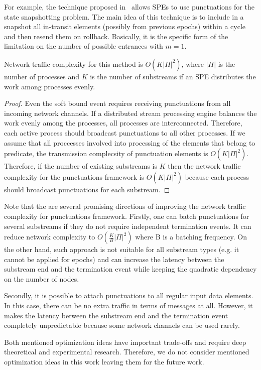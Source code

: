 For example, the technique proposed in~\cite{Carbone:2017:SMA:3137765.3137777} allows SPEs to use punctuations for the state snapshotting problem. The main idea of this technique is to include in a snapshot all in-transit elements (possibly from previous epochs) within a cycle and then resend them on rollback. Basically, it is the specific form of the limitation on the number of possible entrances with $m=1$.

\begin{lemma}
Network traffic complexity for this method is $O(K|\Pi|^2)$, where $|\Pi|$ is the number of processes and $K$ is the number of substreams if an SPE distributes the work among processes evenly.
\end{lemma}
\begin{proof}

Even the soft bound event requires receiving punctuations from all incoming network channels. If a distributed stream processing engine balances the work evenly among the processes, all processes are interconnected. Therefore, each active process should broadcast punctuations to all other processes. If we assume that all proccesses involved into processing of the elements that belong to predicate, the transmission complecsity of punctuation elements is $O(K|\Pi|^2)$. Therefore, if the number of existing substreams is $K$ then the network traffic complexity for the punctuations framework is $O(K|\Pi|^2)$ because each process should broadcast punctuations for each substream. 

\end{proof}

Note that the are several promising directions of improving the network traffic complexity for punctuations framework. Firstly, one can batch punctuations for several substreams if they do not require independent termination events. It can reduce network complexity to $O(\frac{K}{B}|\Pi|^2)$ where B is a batching frequency. On the other hand, such approach is not suitable for all substream types (e.g. it cannot be applied for epochs) and can increase the latency between the substream end and the termination event while keeping the quadratic dependency on the number of nodes.

Secondly, it is possible to attach punctuations to all regular input data elements. In this case, there can be no extra traffic in terms of messages at all. However, it makes the latency between the substream end and the termination event completely unpredictable because some network channels can be used rarely.

Both mentioned optimization ideas have important trade-offs and require deep theoretical and experimental research. Therefore, we do not consider mentioned optimization ideas in this work leaving them for the future work.